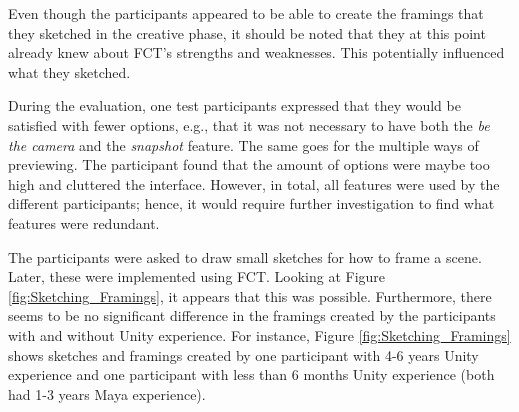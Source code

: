 Even though the participants appeared to be able to create the framings that they sketched in the creative phase, it should be noted that they at this point already knew about FCT's strengths and weaknesses. This potentially influenced what they sketched.

During the evaluation, one test participants expressed that they would be satisfied with fewer options, e.g., that it was not necessary to have both the \textit{be the camera} and the \textit{snapshot} feature. The same goes for the multiple ways of previewing. The participant found that the amount of options were maybe too high and cluttered the interface. However, in total, all features were used by the different participants; hence, it would require further investigation to find what features were redundant.

The participants were asked to draw small sketches for how to frame a scene. Later, these were implemented using FCT. Looking at Figure \ref{fig:Sketching_Framings}, it appears that this was possible. Furthermore, there seems to be no significant difference in the framings created by the participants with and without Unity experience. For instance, Figure \ref{fig:Sketching_Framings} shows sketches and framings created by one participant with 4-6 years Unity experience and one participant with less than 6 months Unity experience (both had 1-3 years Maya experience).